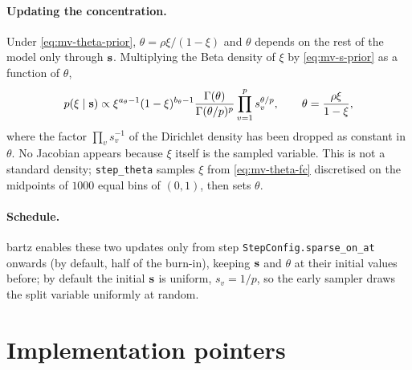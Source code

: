 \paragraph{Updating the concentration.}
Under \eqref{eq:mv-theta-prior}, $\theta = \rho \xi / (1 - \xi)$ and
$\theta$ depends on the rest of the model only through $\mathbf{s}$. Multiplying the
Beta density of $\xi$ by \eqref{eq:mv-s-prior} as a function of $\theta$,
\begin{equation}
	\label{eq:mv-theta-fc}
	p(\xi \mid \mathbf{s}) \propto
	\xi^{a_\theta - 1} (1 - \xi)^{b_\theta - 1}
	\frac{\Gamma(\theta)}{\Gamma(\theta/p)^p}
	\prod_{v=1}^p s_v^{\theta/p},
	\qquad \theta = \frac{\rho \xi}{1 - \xi},
\end{equation}
where the factor $\prod_v s_v^{-1}$ of the Dirichlet density has been
dropped as constant in $\theta$. No Jacobian appears because $\xi$ itself is
the sampled variable. This is not a standard density; \texttt{step\_theta}
samples $\xi$ from \eqref{eq:mv-theta-fc} discretised on the midpoints of
$1000$ equal bins of $(0, 1)$, then sets $\theta$.

\paragraph{Schedule.}
bartz enables these two updates only from step
\texttt{StepConfig.sparse\_on\_at} onwards (by default, half of the burn-in),
keeping $\mathbf{s}$ and $\theta$ at their initial values before; by default the
initial $\mathbf{s}$ is uniform, $s_v = 1/p$, so the early sampler draws the split
variable uniformly at random.

\section{Implementation pointers}
\label{sec:impl-full}

